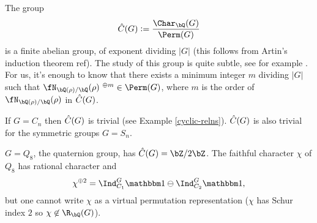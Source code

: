The group $$\C(G) \defeq \frac{\Char_{\bQ}(G)}{\Perm(G)}$$ is a finite abelian group, of exponent dividing $|G|$ (this follows from Artin's induction theorem {\color{red} ref}). The study of this group is quite subtle, see for example \cite{Tim-Alex}. For us, it's enough to know that there exists a minimum integer $m$ dividing $|G|$ such that $\repnorm{\rho}^{\ \oplus m } \in \Perm(G)$, where $m$ is the order of $\repnorm{\rho}$ in $\hat{C}(G)$. 
\begin{example}
If $G = C_n$ then $\hat{C}(G)$ is trivial (see Example \ref{cyclic-relns}). $\hat{C}(G)$ is also trivial for the symmetric groups $G = S_n$. 
\end{example}

 \begin{example}
    $G = Q_8$, the quaternion group, has $\C(G) = \bZ / 2 \bZ$. The faithful character $\chi$ of $Q_8$ has rational character and 
    \[ \chi^{\oplus 2} = \Ind_{C_1}^G \trivial \ominus \Ind_{C_2}^G \trivial, \]
    but one cannot write $\chi$ as a virtual permutation representation ($\chi$ has Schur index $2$ so $\chi \not\in \R_{\bQ}(G)$).  
 \end{example}



